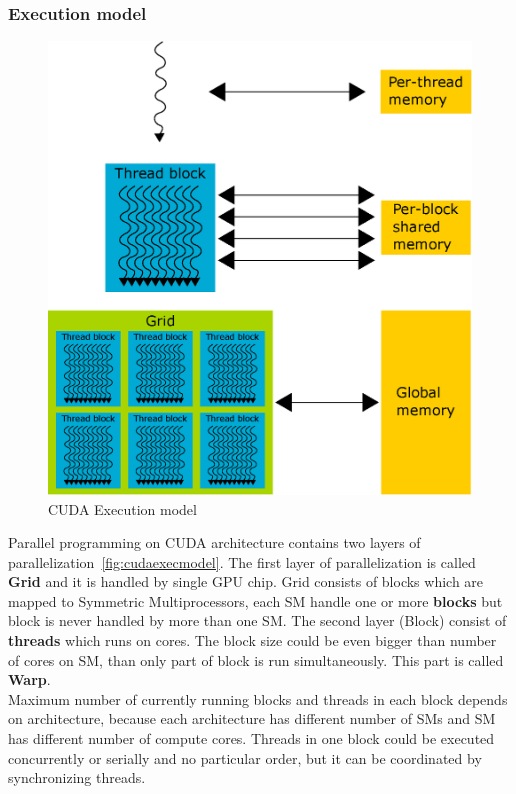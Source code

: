 \subsubsection{Execution model}

\begin{figure}[h]
  \centering
  \includegraphics[width=0.8\linewidth]{img/CUDAExecutionModel.eps}
  \caption{CUDA Execution model}
  \label{fig:cudaexecmodel}
\end{figure}

Parallel programming on CUDA architecture contains two layers of parallelization~\autoref{fig:cudaexecmodel}. The first layer of parallelization is called \textbf{Grid} and it is handled by single GPU chip. Grid consists of blocks which are mapped to Symmetric Multiprocessors, each SM handle one or more \textbf{blocks} but block is never handled by more than one SM. The second layer (Block) consist of \textbf{threads} which runs on cores. The block size could be even bigger than number of cores on SM, than only part of block is run simultaneously. This part is called \textbf{Warp}.\\ Maximum number of currently running blocks and threads in each block depends on architecture, because each architecture has different number of SMs and SM has different number of compute cores. Threads in one block could be executed concurrently or serially and no particular order, but it can be coordinated by synchronizing threads.\\

